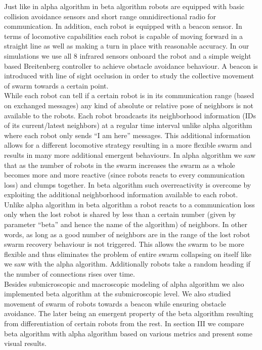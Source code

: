 \documentclass[a4paper, 10pt, conference]{ieeeconf}
\begin{document}
  Just like in alpha algorithm in beta algorithm robots are equipped with basic collision avoidance sensors and short range omnidirectional radio for communication. In addition, each robot is equipped with a beacon sensor. In terms of locomotive capabilities each robot is capable of moving forward in a straight line as well as making a turn in place with reasonable accuracy. In our simulations we use all 8 infrared sensors onboard the robot and a simple weight based Breitenberg controller to achieve obstacle avoidance behaviour. A beacon is introduced with line of sight occlusion in order to study the collective movement of swarm towards a certain point.\\

  While each robot can tell if a certain robot is in its communication range (based on exchanged messages) any kind of absolute or relative pose of neighbors is not available to the robots. Each robot broadcasts its neighborhood information (IDs of its current/latest neighbors) at a regular time interval unlike alpha algorithm where each robot only sends ``I am here'' messages. This additional information allows for a different locomotive strategy resulting in a more flexible swarm and results in many more additional emergent behaviours. In alpha algorithm we saw that as the number of robots in the swarm increases the swarm as a whole becomes more and more reactive (since robots reacts to every communication loss) and clumps together. In beta algorithm such overreactivity is overcome by exploiting the additional neighborhood information available to each robot. Unlike alpha algorithm in beta algorithm a robot reacts to a communication loss only when the lost robot is shared by less than a certain number (given by parameter ``beta'' and hence the name of the algorithm) of neighbors. In other words, as long as a good number of neighbors are in the range of the lost robot swarm recovery behaviour is not triggered. This allows the swarm to be more flexible and thus eliminates the problem of entire swarm collapsing on itself like we saw with the alpha algorithm. Additionally robots take a random heading if the number of connections rises over time.\\

  Besides submicroscopic and macroscopic modeling of alpha algorithm we also implemented beta algorithm at the submicroscopic level. We also studied movement of swarm of robots towards a beacon while ensuring obstacle avoidance. The later being an emergent property of the beta algorithm resulting from differentiation of certain robots from the rest. In section III we compare beta algorithm with alpha algorithm based on various metrics and present some visual results.
\end{document}
